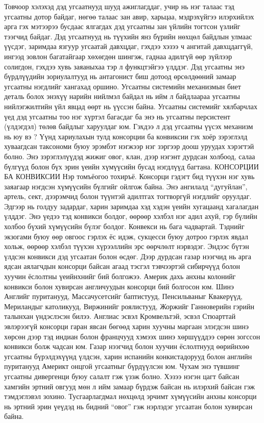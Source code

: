 Товчоор хэлэхэд дэд угсаатнууд шууд ажиглагддаг, учир нь нэг талаас тэд угсаатны дотор байдаг, нөгөө талаас зан авир, харьцаа, мэдрэхүйгээ илэрхийлэх арга гэх мэтээрээ бусдаас ялгагдах дэд угсаатны зан үйлийн тогтсон үзлийг тээгчид байдаг. Дэд угсаатнууд нь түүхийн янз бүрийн нөхцөл байдлын улмаас үүсдэг, заримдаа язгуур угсаатай давхцдаг, гэхдээ хэзээ ч ангитай давхцдаггүй, ингээд зовлон багатайгаар хөхөгдөн шингэж, гаднаа адилгүй өөр зүйлээр солигдон, гэхдээ хувь заяаныхаа тэр л функцтэйгээ үлддэг. Дэд угсаатны энэ бүрдлүүдийн зориулалтууд нь антагонист биш дотоод өрсөлдөөний замаар угсаатны нэгдлийг хангахад оршино. Угсаатны системийн механизмын биет деталь болох энэхүү нарийн нийлмэл байдал нь ийм л байдлаараа угсаатны нийлэгжилтийн үйл явцад өөрт нь үүссэн байна. Угсаатны системийг хялбарчлах үед дэд угсаатны тоо нэг хүртэл багасдаг ба энэ нь угсаатны персистент (үлдэгдэл) төлөв байдлыг харуулдаг юм. Гэхдээ л дэд угсаатны үүсэх механизм нь юу вэ ? Үүнд хариулахын тулд консорции ба конвиксии гэх хоёр зэрэглэлд хуваагдсан таксономи буюу эрэмбэт нэгжээр нэг зэргээр доош уруудах хэрэгтэй болно. Энэ зэрэглэлүүдэд жижиг овог, клан, дээр нэгэнт дурдсан холбоод, салаа бүлгүүд болон бүх эрин үеийн хүмүүсийн бусад нэгдлүүд багтана.
КОНСОРЦИИ БА КОНВИКСИИ
Нэр томъёогоо тохиръё. Консорци гэдэгт бид түүхэн нэг хувь заяагаар нэгдсэн хүмүүсийн бүлгийг ойлгож байна. Энэ ангилалд “дугуйлан”, артель, сект, дээрэмчид болон түүнтэй адилтгах тогтворгүй нэгдлийг оруулдаг. Эдгээр нь голдуу задардаг, харин заримдаа хэд хэдэн үеийн хугацаанд хагалагдан үлддэг. Энэ үедээ тэд конвикси болдог, өөрөөр хэлбэл нэг адил ахуй, гэр бүлийн холбоо бүхий хүмүүсийн бүлэг болдог. Конвекси нь бага чадвартай. Тэднийг экзогами буюу өөр овгоос гэрлэх ёс идэж, сукцесси буюу дотроо гэрлэх явдал хольж, өөрөөр хэлбэл түүхэн хүрээллийн эрс өөрчлөлт нэрвэдэг. Эндээс бүтэн үлдсэн конвикси дэд угсаатан болон өсдөг. Дээр дурдсан газар нээгчид нь арга ядсан аялагчдын консорци байсан агаад тэсгэл тэвчээртэй сибирчүүд болон хуучин ёслолтны үеийнхнийг бий болгожээ. Америк дахь анхны колонийг конвикси болон хувирсан англичуудын консорци бий болгосон юм. Шинэ Английг пуританууд, Массачусетсийг баптистууд, Пенсильваныг Квакерүүд, Мериландыг католикууд, Виржинийг роялистууд, Жоржийг Ганноверийн гэрийн талынхан үндэслэсэн билээ. Англиас эсвэл Кромвельтэй, эсвэл Стюарттай эвлэрээгүй консорци гаран явсан бөгөөд харин хуучны маргаан элэгдсэн шинэ хөрсөн дээр тэд индиан болон францчууд хэмээх шинэ хөршүүддээ сөрөн зогссон конвикси болж чадсан юм.
Газар нээгчид болон хуучин ёслолтнууд өөрийнхөө угсаатны бүрэлдэхүүнд үлдсэн, харин испанийн конкистадорууд болон английн пуританууд Америкт онцгой угсаатныг бүрдүүлсэн юм. Чухам энэ түвшинг угсаатны дивергенци буюу салалт гэж үзэж болно. Хэзээ нэгэн цагт байсан хамгийн эртний овгууд мөн л ийм замаар бүрдэж байсан нь илэрхий байсан гэж тэмдэглэвэл зохино. Тусгаарлагдмал нөхцөлд эрчимт хүмүүсийн анхны консорци нь эртний эрин үеүдэд нь бидний “овог” гэж нэрлэдэг угсаатан болон хувирсан байна.
